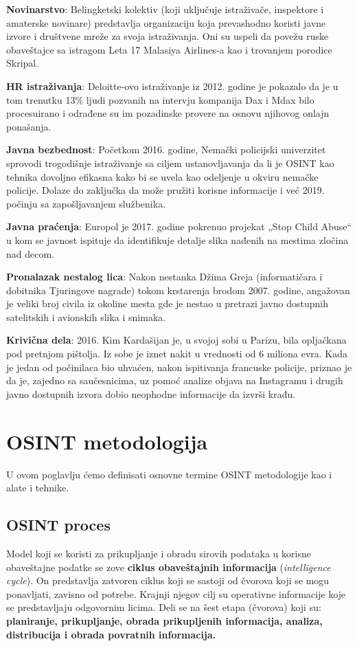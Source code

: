 \documentclass[fleqn, 12pt]{article}
\begin{document}
\textbf{Novinarstvo}: Belingketski kolektiv (koji uključuje istraživače, inspektore i amaterske novinare) predstavlja organizaciju koja prevashodno koristi javne izvore i društvene mreže za svoja istraživanja. Oni su uspeli da povežu ruske obaveštajce sa istragom Leta 17 Malasiya Airlines-a kao i trovanjem porodice Skripal.\newline

\textbf{HR istraživanja}: Deloitte-ovo istraživanje iz 2012. godine je pokazalo da je u tom trenutku 13$\%$ ljudi pozvanih na intervju kompanija Dax i Mdax bilo procesuirano i odrađene su im pozadinske provere na osnovu njihovog onlajn ponašanja.\newline

\textbf{Javna bezbednost}: Početkom 2016. godine, Nemački policijski univerzitet sprovodi trogodišnje istraživanje sa ciljem ustanovljavanja da li je OSINT kao tehnika dovoljno efikasna kako bi se uvela kao odeljenje u okviru nemačke policije. Dolaze do zaključka da može pružiti korisne informacije i već 2019. počinju sa zapošljavanjem službenika.\newline

\textbf{Javna praćenja}:  Europol je 2017. godine pokrenuo projekat „Stop Child Abuse“ u kom se javnost ispituje da identifikuje detalje slika nađenih na mestima zločina nad decom.\newline

\textbf{Pronalazak nestalog lica}: Nakon nestanka Džima Greja (informatičara i dobitnika Tjuringove nagrade) tokom krstarenja brodom 2007. godine, angažovan je veliki broj civila iz okoline mesta gde je nestao u pretrazi javno dostupnih satelitskih i avionskih slika i snimaka.\newline

\textbf{Krivična dela}: 2016. Kim Kardašijan je, u svojoj sobi u Parizu, bila opljačkana pod pretnjom pištolja. Iz sobe je iznet nakit u vrednosti od 6 miliona evra. Kada je jedan od počinilaca bio uhvaćen, nakon ispitivanja francuske policije, priznao je da je, zajedno sa saučesnicima, uz pomoć analize objava na Instagramu i drugih javno dostupnih izvora dobio neophodne informacije da izvrši krađu.\newpage
\section{OSINT metodologija}
U ovom poglavlju ćemo definisati osnovne termine OSINT metodologije kao i alate i tehnike.
\subsection{OSINT proces}
Model koji se koristi za prikupljanje i obradu sirovih podataka u korisne obaveštajne podatke se zove {\bf ciklus obaveštajnih informacija} (\textit{intelligence cycle}). On predstavlja zatvoren ciklus koji se sastoji od čvorova koji se mogu ponavljati, zavisno od potrebe. Krajnji njegov cilj su operativne informacije koje se predstavljaju odgovornim licima. Deli se na šest etapa (čvorova) koji su: {\bf planiranje, prikupljanje, obrada prikupljenih informacija, analiza, distribucija i obrada povratnih informacija.}\newline
\end{document}
